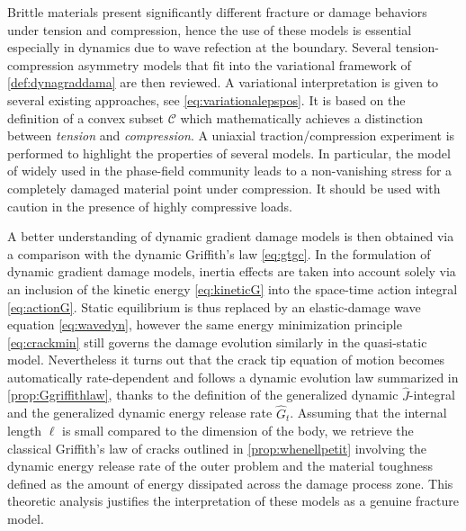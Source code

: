 Brittle materials present significantly different fracture or damage behaviors under tension and compression, hence the use of these models is essential especially in dynamics due to wave refection at the boundary. Several tension-compression asymmetry models that fit into the variational framework of \cref{def:dynagraddama} are then reviewed. A variational interpretation is given to several existing approaches, see \eqref{eq:variationalepspos}. It is based on the definition of a convex subset $\mathcal{C}$ which mathematically achieves a distinction between \emph{tension} and \emph{compression}. A uniaxial traction/compression experiment is performed to highlight the properties of several models. In particular, the model of \cite{MieheHofackerWelschinger:2010} widely used in the phase-field community leads to a non-vanishing stress for a completely damaged material point under compression. It should be used with caution in the presence of highly compressive loads.

A better understanding of dynamic gradient damage models is then obtained via a comparison with the dynamic Griffith's law \eqref{eq:gtgc}. In the formulation of dynamic gradient damage models, inertia effects are taken into account solely via an inclusion of the kinetic energy \eqref{eq:kineticG} into the space-time action integral \eqref{eq:actionG}. Static equilibrium is thus replaced by an elastic-damage wave equation \eqref{eq:wavedyn}, however the same energy minimization principle \eqref{eq:crackmin} still governs the damage evolution similarly in the quasi-static model. Nevertheless it turns out that the crack tip equation of motion becomes automatically rate-dependent and follows a dynamic evolution law summarized in \cref{prop:Ggriffithlaw}, thanks to the definition of the generalized dynamic $\widehat{J}$-integral and the generalized dynamic energy release rate $\widehat{G}_t$. Assuming that the internal length $\ell$ is small compared to the dimension of the body, we retrieve the classical Griffith's law of cracks outlined in \cref{prop:whenellpetit} involving the dynamic energy release rate of the outer problem and the material toughness defined as the amount of energy dissipated across the damage process zone. This theoretic analysis justifies the interpretation of these models as a genuine fracture model.